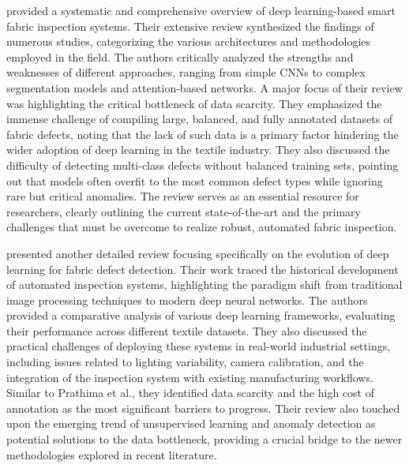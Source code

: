\documentclass{ieeeaccess}
\begin{document}
\cite{b9} provided a systematic and comprehensive overview of deep learning-based smart fabric inspection systems. Their extensive review synthesized the findings of numerous studies, categorizing the various architectures and methodologies employed in the field. The authors critically analyzed the strengths and weaknesses of different approaches, ranging from simple CNNs to complex segmentation models and attention-based networks. A major focus of their review was highlighting the critical bottleneck of data scarcity. They emphasized the immense challenge of compiling large, balanced, and fully annotated datasets of fabric defects, noting that the lack of such data is a primary factor hindering the wider adoption of deep learning in the textile industry. They also discussed the difficulty of detecting multi-class defects without balanced training sets, pointing out that models often overfit to the most common defect types while ignoring rare but critical anomalies. The review serves as an essential resource for researchers, clearly outlining the current state-of-the-art and the primary challenges that must be overcome to realize robust, automated fabric inspection.

\cite{b10} presented another detailed review focusing specifically on the evolution of deep learning for fabric defect detection. Their work traced the historical development of automated inspection systems, highlighting the paradigm shift from traditional image processing techniques to modern deep neural networks. The authors provided a comparative analysis of various deep learning frameworks, evaluating their performance across different textile datasets. They also discussed the practical challenges of deploying these systems in real-world industrial settings, including issues related to lighting variability, camera calibration, and the integration of the inspection system with existing manufacturing workflows. Similar to Prathima et al., they identified data scarcity and the high cost of annotation as the most significant barriers to progress. Their review also touched upon the emerging trend of unsupervised learning and anomaly detection as potential solutions to the data bottleneck, providing a crucial bridge to the newer methodologies explored in recent literature.
\end{document}
